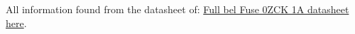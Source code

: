 \documentclass{article}
\begin{document}
All information found from the datasheet of:
\href{http://www.belfuse.com/pdfs/0ZCK.pdf}{Full bel Fuse 0ZCK 1A datasheet here}.

\end{document}
